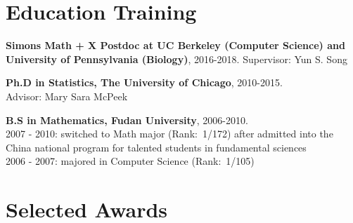 \documentclass[letterpaper]{article}
\renewenvironment{itemize}{
  \begin{list}{}{
    \setlength{\leftmargin}{1.5em}
  }
}{
  \end{list}
}
\begin{document}
\section*{Education Training}
\begin{itemize}
\item {\bf Simons Math + X Postdoc at UC Berkeley (Computer Science) and University of Pennsylvania (Biology)}, 2016-2018. Supervisor: Yun S. Song
\item {\bf Ph.D in Statistics, The University of Chicago}, 2010-2015.\\
Advisor: Mary Sara McPeek
\item {\bf B.S in Mathematics, Fudan University}, 2006-2010.\\
2007 - 2010: switched to Math major (Rank:\ 1/172) after admitted into the China national program for talented students in fundamental sciences\\
2006 - 2007: majored in Computer Science (Rank:\ 1/105)
\end{itemize}





\section*{Selected Awards}
\end{document}
